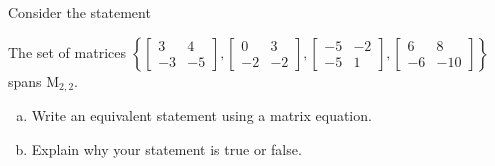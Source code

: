 
\begin{exerciseStatement}


Consider the statement 
\begin{center}\begin{minipage}{0.8\textwidth}
 The set of matrices \( \left\{ \left[\begin{array}{cc}
3 & 4 \\
-3 & -5
\end{array}\right] , \left[\begin{array}{cc}
0 & 3 \\
-2 & -2
\end{array}\right] , \left[\begin{array}{cc}
-5 & -2 \\
-5 & 1
\end{array}\right] , \left[\begin{array}{cc}
6 & 8 \\
-6 & -10
\end{array}\right] \right\} \) spans \(\mathrm{M}_{2,2}\). 
\end{minipage}\end{center}
    


\begin{enumerate}[(a)]
\item  Write an equivalent statement using a matrix equation.
\item  Explain why your statement is true or false.
\end{enumerate}
    
\end{exerciseStatement}
    
